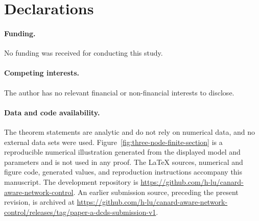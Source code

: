 \documentclass[11pt]{article}
\begin{document}
\section*{Declarations}
\paragraph{Funding.} No funding was received for conducting this study.
\paragraph{Competing interests.} The author has no relevant financial or
non-financial interests to disclose.
\paragraph{Data and code availability.} The theorem statements are analytic
and do not rely on numerical data, and no external data sets were used.
Figure~\ref{fig:three-node-finite-section} is a reproducible numerical
illustration generated from the displayed model and parameters and is not
used in any proof.  The \LaTeX{} sources, numerical and figure code, generated values, and
reproduction instructions accompany this manuscript.  The development
repository is \url{https://github.com/h-lu/canard-aware-network-control}.
An earlier submission source, preceding the present revision, is archived at
\url{https://github.com/h-lu/canard-aware-network-control/releases/tag/paper-a-dcds-submission-v1}.

\appendix
{}


\begingroup
\small


\endgroup
\end{document}
